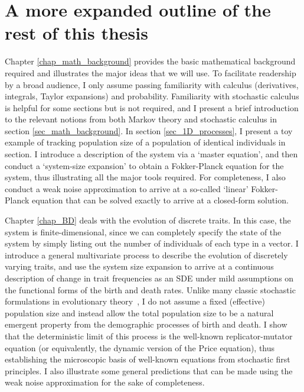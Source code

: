 \section{A more expanded outline of the rest of this thesis}

Chapter \ref{chap_math_background} provides the basic mathematical background required and illustrates the major ideas that we will use. To facilitate readership by a broad audience, I only assume passing familiarity with calculus (derivatives, integrals, Taylor expansions) and probability. Familiarity with stochastic calculus is helpful for some sections but is not required, and I present a brief introduction to the relevant notions from both Markov theory and stochastic calculus in section \ref{sec_math_background}. In section \ref{sec_1D_processes}, I present a toy example of tracking population size of a population of identical individuals in section. I introduce a description of the system via a `master equation', and then conduct a `system-size expansion' to obtain a Fokker-Planck equation for the system, thus illustrating all the major tools required. For completeness, I also conduct a weak noise approximation to arrive at a so-called `linear' Fokker-Planck equation that can be solved exactly to arrive at a closed-form solution.

Chapter \ref{chap_BD} deals with the evolution of discrete traits. In this case, the system is finite-dimensional, since we can completely specify the state of the system by simply listing out the number of individuals of each type in a vector. I introduce a general multivariate process to describe the evolution of discretely varying traits, and use the system size expansion to arrive at a continuous description of change in trait frequencies as an SDE under mild assumptions on the functional forms of the birth and death rates. Unlike many classic stochastic formulations in evolutionary theory~\citep{fisher_genetical_1930,wright_evolution_1931,moran_random_1958,crow_introduction_1970, lande_natural_1976,kimura_probability_1974}, I do not assume a fixed (effective) population size and instead allow the total population size to be a natural emergent property from the demographic processes of birth and death. I show that the deterministic limit of this process is the well-known replicator-mutator equation (or equivalently, the dynamic version of the Price equation), thus establishing the microscopic basis of well-known equations from stochastic first principles. I also illustrate some general predictions that can be made using the weak noise approximation for the sake of completeness.

